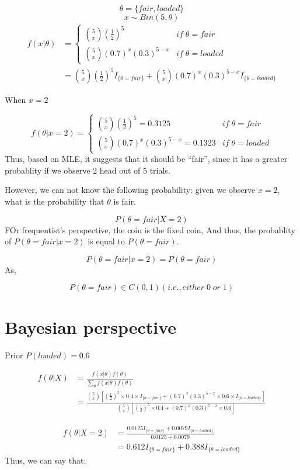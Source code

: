 \documentclass[]{book}
\begin{document}
\[\theta = \{ fair , loaded \}\] \[x \sim Bin (5, \theta)\]
\[\begin{aligned} f(x|\theta) &=\begin{cases} \binom{5}{x} (\frac{1}{2})^5 & if \; \theta=fair  \\ \binom{5}{x} (0.7)^x(0.3)^{5-x} & if \;  \theta=loaded  \end{cases} \\ &= \binom{5}{x} (\frac{1}{2})^5 I_{\{\theta=fair \}}+\binom{5}{x} (0.7)^x(0.3)^{5-x}I_{\{\theta=loaded \}}\end{aligned}\]

When \(x=2\)

\[f(\theta | x=2)=\begin{cases} \binom{5}{x} (\frac{1}{2})^5 = 0.3125& if \; \theta=fair  \\ \binom{5}{x} (0.7)^x(0.3)^{5-x} = 0.1323& if \;  \theta=loaded  \end{cases}\]
Thus, based on MLE, it suggests that it should be ``fair'', since it has
a greater probablity if we observe 2 head out of 5 trials.

However, we can not know the following probability: given we observe
\(x=2\), what is the probability that \(\theta\) is fair.

\[P(\theta=fair | X=2)\] FOr frequentist's perspective, the coin is the
fixed coin, And thus, the probablity of \(P(\theta=fair|x=2)\) is equal
to \(P(\theta=fair)\).

\[P(\theta=fair|x=2)=P(\theta=fair)\] As,

\[P(\theta=fair) \in C(0,1) (i.e., either \; 0 \; or \; 1)\]

\section{Bayesian perspective}\label{bayesian-perspective}

Prior \(P(loaded)=0.6\)

\[\begin{aligned} f(\theta | X) &= \frac{f(x|\theta) f(\theta)}{\sum_{\theta} f(x|\theta)f(\theta)} \\ &=\frac{\binom{5}{x} [(\frac{1}{2})^5 \times 0.4 \times I_{\{\theta=fair \}}+ (0.7)^x(0.3)^{5-x} \times 0.6 \times I_{\{\theta=loaded \}}]}{\binom{5}{x} [(\frac{1}{2})^5 \times 0.4 + (0.7)^x(0.3)^{5-x} \times 0.6]}  \end{aligned}\]

\[\begin{aligned} f(\theta |X=2) &=\frac{0.0125 I_{\{\theta=fair \}}+0.0079 I_{\{\theta=loaded \}} }{0.0125+0.0079} \\ &= 0.612 I_{\{\theta=fair \}} + 0.388 I_{\{\theta=loaded \}} \end{aligned}\]
Thus, we can say that:
\end{document}
